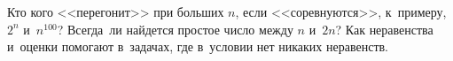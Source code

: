 



Кто кого <<перегонит>> при больших $n$, если <<соревнуются>>, к~примеру,
$2^{n}$ и~$n^{100}$?
Всегда~ли найдется простое число между $n$ и~$2n$?
Как неравенства и~оценки помогают в~задачах, где в~условии нет никаких
неравенств.

